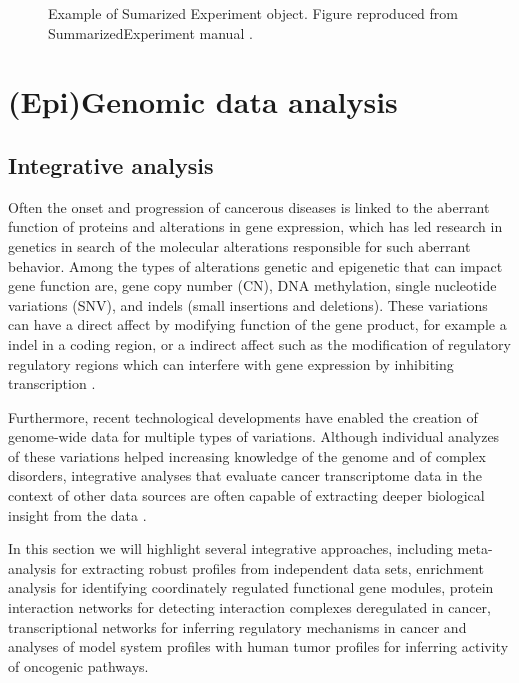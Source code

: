 \begin{description}
\begin{figure}[ht!]
  \caption{\label{fig:SE} Example of Sumarized Experiment object. Figure reproduced from SummarizedExperiment manual \cite{SummarizedExperiment}.}
  \end{figure}
  \item [\sigla{MAE}{MultiAssayExperiment}:]
\end{description}





\section{(Epi)Genomic data analysis} \label{sec:concept-analysis}

\subsection{Integrative analysis}
Often the onset and progression of cancerous diseases is linked to the aberrant function of proteins and alterations in gene expression, which has led research in genetics in search of the molecular alterations responsible for such aberrant behavior.
Among the types of alterations genetic and epigenetic
that can impact gene function are, gene copy number
(CN), DNA methylation, single nucleotide variations (SNV), and indels (small insertions and
deletions).
These variations can have a direct affect by modifying
 function of the gene product, for example a
indel in a coding region, or a indirect affect such as
the modification of regulatory regulatory regions
 which can interfere
 with gene expression by inhibiting transcription \cite{thingholm2016strategies}.

Furthermore, recent technological developments have enabled the creation of genome-wide data for multiple types of variations.
Although individual analyzes of these variations helped  increasing knowledge of the genome and of complex
disorders, integrative analyses that evaluate cancer transcriptome data in the context of other data sources are often capable of extracting deeper biological insight from the data \cite{rhodes2005integrative}.

In this section we will highlight several integrative  approaches, including meta-analysis for extracting robust profiles from independent data sets, enrichment analysis for identifying coordinately regulated functional gene modules, protein interaction networks for detecting interaction complexes deregulated in cancer, transcriptional networks for inferring regulatory mechanisms in cancer and analyses of model system profiles with human tumor profiles for inferring activity of oncogenic pathways.

